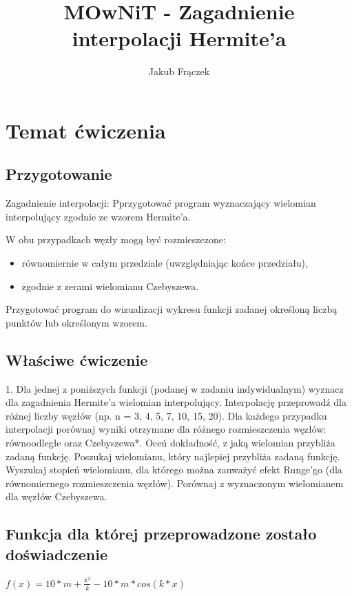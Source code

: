 \documentclass{article}
\title{MOwNiT - Zagadnienie interpolacji Hermite'a}
\author{Jakub Frączek}
\begin{document}
\maketitle

\section{Temat ćwiczenia}

\subsection{Przygotowanie}

Zagadnienie interpolacji:
Pprzygotować program wyznaczający wielomian interpolujący zgodnie ze wzorem Hermite'a.

W obu przypadkach węzły mogą być rozmieszczone:
\begin{itemize}
\item równomiernie w całym przedziale (uwzględniając końce przedziału),
\item zgodnie z zerami wielomianu Czebyszewa.
\end{itemize}

Przygotować program do wizualizacji wykresu funkcji zadanej określoną liczbą punktów lub określonym wzorem.

\subsection{Właściwe ćwiczenie}

1. Dla jednej z poniższych funkcji (podanej w zadaniu indywidualnym) wyznacz dla zagadnienia 
Hermite’a wielomian interpolujący.  
Interpolację przeprowadź dla różnej liczby węzłów (np. n = 3, 4, 5, 7, 10, 15, 20). Dla każdego 
przypadku interpolacji porównaj wyniki otrzymane dla różnego rozmieszczenia węzłów: 
równoodległe oraz Czebyszewa*. 
Oceń dokładność, z jaką wielomian przybliża zadaną funkcję.  
Poszukaj wielomianu, który najlepiej przybliża zadaną funkcję. 
Wyszukaj stopień wielomianu, dla którego można zauważyć efekt Runge’go (dla równomiernego 
rozmieszczenia węzłów). Porównaj z wyznaczonym wielomianem dla węzłów Czebyszewa.

\subsection{Funkcja dla której przeprowadzone zostało doświadczenie}

\begin{center}
\(f(x) = 10 * m + \frac{\mathrm{x}_{}^{2}}{k} - 10 * m * cos(k*x)\)
\end{center}
\end{document}
